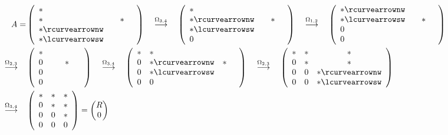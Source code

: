 \documentclass[ngerman,fontsize=11pt, paper=a4, parskip=half, titlepage=true, toc=bib]{scrbook}
\begin{document}
	\begin{align*}
		A= &
		\left(\begin{array}{lccc}
			*~ &&&\\
			* &&* \\
			* \rcurvearrownw \\ * \lcurvearrowsw
		\end{array}\right)
		\quad \overset{\Omega_{3,4}}{\longrightarrow} \quad
		\left(\begin{array}{lccc}
			*~ &&&\\
			* \rcurvearrownw && *\\
			* \lcurvearrowsw \\
			0
		\end{array}\right)
		\quad \overset{\Omega_{1,2}}{\longrightarrow} \quad
		\left(\begin{array}{lccc}
		* \rcurvearrownw\\
		* \lcurvearrowsw && *& \\
		0 \\
		0
		\end{array}\right)\\
		\quad \overset{\Omega_{2,3}}{\longrightarrow} \quad
		&\left(\begin{array}{lccc}
			*~~ \\
			0 && *&~ \\
			0 \\
			0
		\end{array}\right)
		\quad \overset{\Omega_{3,4}}{\longrightarrow} \quad	
		\left(\begin{array}{clcc}
			* & *\\
			0 & *  \rcurvearrownw  & *& \\
			0 & * \lcurvearrowsw \\
			0 & 0
		\end{array}\right)
		\quad \overset{\Omega_{2,3}}{\longrightarrow} \quad	
		\left(\begin{array}{cccl}
			* & *  & * \\
			0 & *  & * \\ 
			0 & 0 & * \rcurvearrownw\\
			0 & 0 & *  \lcurvearrowsw 
		\end{array}\right) \\
		\quad \overset{\Omega_{3,4}}{\longrightarrow} \quad	
		& \left(\begin{array}{cccc}
		* & *  & *  \\
		0 & *  & * \\ 
		0 & 0 & * \\
		0 & 0 & 0
		\end{array}\right)
		= \begin{pmatrix}
			R \\ 0 
		\end{pmatrix}
	\end{align*}
\end{document}
